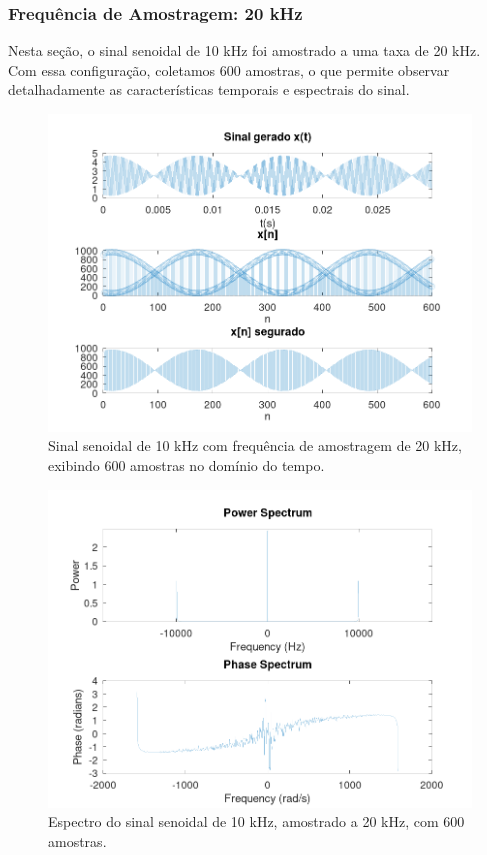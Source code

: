 \subsubsection{Frequência de Amostragem: 20 kHz}

Nesta seção, o sinal senoidal de 10 kHz foi amostrado a uma taxa de 20 kHz. Com essa configuração, coletamos 600 amostras, o que permite observar detalhadamente as características temporais e espectrais do sinal.

\begin{figure}[H]
    \centering
    \includegraphics[width=1\linewidth]{03_results/assets/sin__10KHz_fs20k_SIGNAL_600smp.png}
    \caption{Sinal senoidal de 10 kHz com frequência de amostragem de 20 kHz, exibindo 600 amostras no domínio do tempo.}
    \label{fig:signal-20kHz-10kHz-600smp}
\end{figure}

\begin{figure}[H]
    \centering
    \includegraphics[width=1\linewidth]{03_results/assets/sin__10KHz_fs20k_SPECTRUM_600smp.png}
    \caption{Espectro do sinal senoidal de 10 kHz, amostrado a 20 kHz, com 600 amostras.}
    \label{fig:spectrum-20kHz-10kHz-600smp}
\end{figure}

